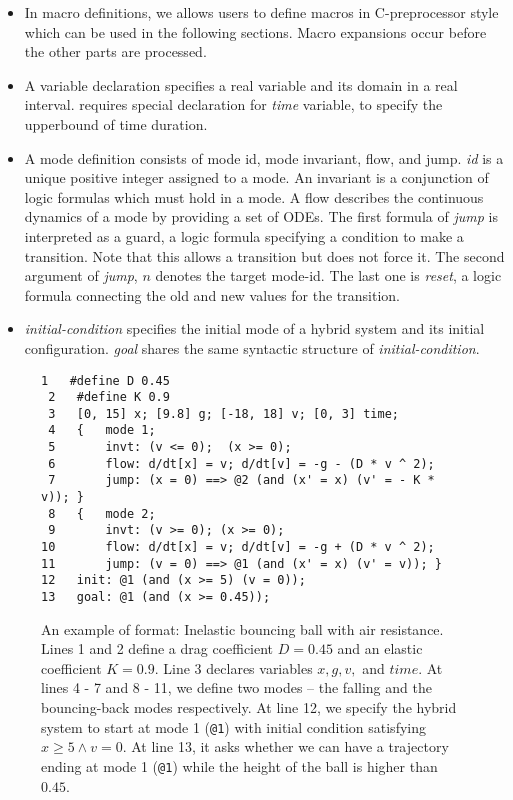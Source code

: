 \begin{itemize}
\item In macro definitions, we allows users to define macros in C-preprocessor style which can be used in the following
sections. Macro expansions occur before the other parts are processed.

\item A variable declaration specifies a real variable and its domain
  in a real interval. \dReach{} requires special declaration for
  \textit{time} variable, to specify the upperbound of time duration.

\item A mode definition consists of mode id, mode invariant, flow, and
  jump.  \textit{id} is a unique positive integer assigned to a
  mode. An invariant is a conjunction of logic formulas which must hold
  in a mode. A flow describes the continuous dynamics of a mode by
  providing a set of ODEs. The first formula of \textit{jump} is
  interpreted as a guard, a logic formula specifying a condition to
  make a transition. Note that this allows a transition but does not
  force it. The second argument of \textit{jump}, $n$ denotes the
  target mode-id. The last one is \textit{reset}, a logic formula
  connecting the old and new values for the transition.

\item \textit{initial-condition} specifies the initial mode of a hybrid
system and its initial configuration. \textit{goal} shares the same
syntactic structure of \textit{initial-condition}.
\end{itemize}
\vspace{-1.0em}
\begin{figure}
  \centering
  \begin{Verbatim}[fontfamily=courier, frame=single, framesep=1mm, fontsize=\scriptsize]
 1   #define D 0.45
 2   #define K 0.9
 3   [0, 15] x; [9.8] g; [-18, 18] v; [0, 3] time;
 4   {   mode 1;
 5       invt: (v <= 0);  (x >= 0);
 6       flow: d/dt[x] = v; d/dt[v] = -g - (D * v ^ 2);
 7       jump: (x = 0) ==> @2 (and (x' = x) (v' = - K * v)); }
 8   {   mode 2;
 9       invt: (v >= 0); (x >= 0);
10       flow: d/dt[x] = v; d/dt[v] = -g + (D * v ^ 2);
11       jump: (v = 0) ==> @1 (and (x' = x) (v' = v)); }
12   init: @1 (and (x >= 5) (v = 0));
13   goal: @1 (and (x >= 0.45));
\end{Verbatim}
\caption{An example of \drh{} format: Inelastic bouncing ball with air
  resistance. Lines 1 and 2 define a drag coefficient $D = 0.45$ and
  an elastic coefficient $K = 0.9$. Line 3 declares variables
  $x, g, v,$ and $time$. At lines 4 - 7 and 8 - 11, we define two
  modes -- the falling and the bouncing-back modes respectively. At
  line 12, we specify the hybrid system to start at mode 1
  (\texttt{@1}) with initial condition satisfying
  $x \ge 5 \land v = 0$. At line 13, it asks whether we can have
  a trajectory ending at mode 1 (\texttt{@1}) while the height of the
  ball is higher than $0.45$.}
\label{fig:bouncing-ball-drh}
\end{figure}
\vspace{-1.6em}
